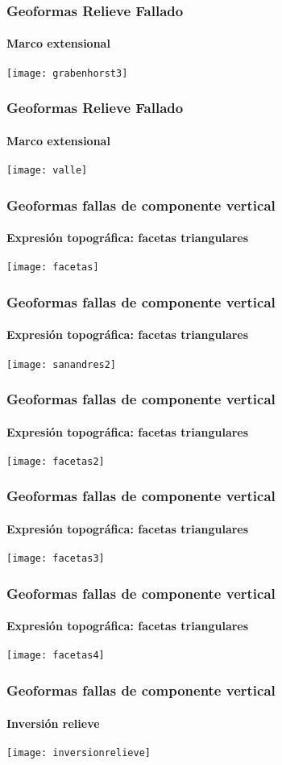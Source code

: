 \documentclass{beamer}
\begin{document}
\begin{frame}
\frametitle{Geoformas Relieve Fallado}
\framesubtitle{Marco extensional}
\begin{center}
\texttt{[image: grabenhorst3]}
\end{center}
\end{frame}
\begin{frame}
\frametitle{Geoformas Relieve Fallado}
\framesubtitle{Marco extensional}
\centering
\texttt{[image: valle]}
\end{frame}
\begin{frame}
\frametitle{Geoformas fallas de componente vertical}
\framesubtitle{Expresión topográfica: facetas triangulares}
\centering
\texttt{[image: facetas]}
\end{frame}
\begin{frame}
\frametitle{Geoformas fallas de componente vertical}
\framesubtitle{Expresión topográfica: facetas triangulares}
\centering
\texttt{[image: sanandres2]}
\end{frame}
\begin{frame}
\frametitle{Geoformas fallas de componente vertical}
\framesubtitle{Expresión topográfica: facetas triangulares}
\centering
\texttt{[image: facetas2]}
\end{frame}
\begin{frame}
\frametitle{Geoformas fallas de componente vertical}
\framesubtitle{Expresión topográfica: facetas triangulares}
\centering
\texttt{[image: facetas3]}
\end{frame}
\begin{frame}
\frametitle{Geoformas fallas de componente vertical}
\framesubtitle{Expresión topográfica: facetas triangulares}
\centering
\texttt{[image: facetas4]}
\end{frame}
\begin{frame}
\frametitle{Geoformas fallas de componente vertical}
\framesubtitle{Inversión relieve}
\centering
\texttt{[image: inversionrelieve]}
\end{frame}
\end{document}
